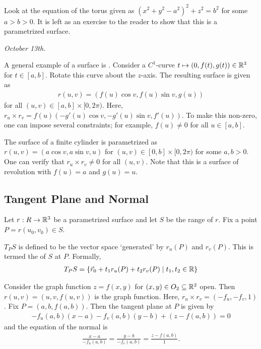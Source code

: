 \begin{example}
    Look at the equation of the torus given as $(x^{2}+y^{2}-a^{2})^{2}+z^{2} = b^{2}$ for some $a > b > 0$. It is left as an exercise to the reader to show that this is a parametrized surface.
\end{example}

\textit{October 13th.}

\begin{example}
    A general example of a surface is . Consider a $C^{1}$-curve $t \mapsto (0,f(t),g(t)) \in \mathbb{R}^{3}$ for $t \in [a,b]$. Rotate this curve about the $z$-axis. The resulting surface is given as
    \begin{align}
        r(u,v) = (f(u)\cos v, f(u) \sin v, g(u))
    \end{align}
    for all $(u,v) \in [a,b] \times [0,2\pi)$. Here, $r_{u} \times r_{v} = f(u)(-g'(u) \cos v, -g'(u) \sin v, f'(u))$. To make this non-zero, one can impose several constraints; for example, $f(u) \neq 0$ for all $u \in [a,b]$.
\end{example}

\begin{example}
    The surface of a finite cylinder is parametrized as $r(u,v) = (a\cos v, a \sin v, u)$ for $(u,v) \in [0,b] \times [0,2\pi)$ for some $a,b > 0$. One can verify that $r_{u} \times r_{v} \neq 0$ for all $(u,v)$. Note that this is a surface of revolution with $f(u) = a$ and $g(u) = u$.
\end{example}

\subsection{Tangent Plane and Normal}

Let $r:R \to \mathbb{R}^{3}$ be a parametrized surface and let $S$ be the range of $r$. Fix a point $P = r(u_{0},v_{0}) \in S$.

\begin{definition}
    $T_{P}S$ is defined to be the vector space `generated' by $r_{u}(P)$ and $r_{v}(P)$. This is termed the  of $S$ at $P$. Formally,
    \begin{align}
        T_{P}S = \{ \vec{r}_{0} + t_{1}r_{u}(P) + t_{2}r_{v}(P) \mid t_{1},t_{2} \in \mathbb{R}\}
    \end{align}
\end{definition}

\begin{example}
    Consider the graph function $z = f(x,y)$ for $(x,y) \in O_{2} \subseteq \mathbb{R}^{2}$ open. Then $r(u,v) = (u,v,f(u,v))$ is the graph function. Here, $r_{u} \times r_{v} = (-f_{u},-f_{v},1)$. Fix $P = (a,b,f(a,b))$. Then the tangent plane at $P$ is given by
    \begin{align}
        -f_{u}(a,b)(x-a) - f_{v}(a,b)(y-b) + (z-f(a,b)) = 0
    \end{align}
    and the equation of the normal is
    \begin{align}
        \frac{x-a}{-f_{u}(a,b)} = \frac{y-b}{-f_{v}(a,b)} = \frac{z-f(a,b)}{1}.
    \end{align}
\end{example}

